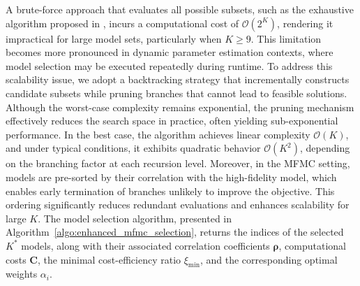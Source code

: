 A brute-force approach that evaluates all possible subsets, such as the exhaustive algorithm proposed in \cite{PeWiGu:2016}, incurs a computational cost of $\mathcal{O}(2^K)$, rendering it impractical for large model sets, particularly when $K \geq 9$. This limitation becomes more pronounced in dynamic parameter estimation contexts, where model selection may be executed repeatedly during runtime. To address this scalability issue, we adopt a backtracking strategy that incrementally constructs candidate subsets while pruning branches that cannot lead to feasible solutions. Although the worst-case complexity remains exponential, the pruning mechanism effectively reduces the search space in practice, often yielding sub-exponential performance. In the best case, the algorithm achieves linear complexity $\mathcal{O}(K)$, and under typical conditions, it exhibits quadratic behavior $\mathcal{O}(K^2)$, depending on the branching factor at each recursion level. Moreover, in the MFMC setting, models are pre-sorted by their correlation with the high-fidelity model, which enables early termination of branches unlikely to improve the objective. This ordering significantly reduces redundant evaluations and enhances scalability for large $K$. The model selection algorithm, presented in Algorithm~\ref{algo:enhanced_mfmc_selection}, returns the indices of the selected $K^*$ models, along with their associated correlation coefficients $\boldsymbol{\rho}$, computational costs $\boldsymbol{C}$, the minimal cost-efficiency ratio $\xi_{\text{min}}$, and the corresponding optimal weights $\alpha_i$.




    
